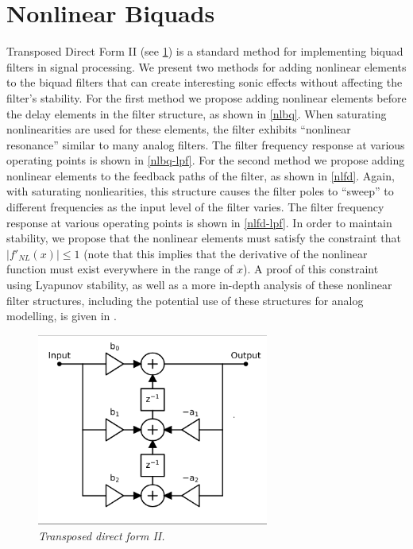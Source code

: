 \documentclass[twoside,a4paper]{article}
\begin{document}
\section{Nonlinear Biquads} \label{sec:nlbq}
%
Transposed Direct Form II (see \cref{tdf2}) is a standard method for
implementing biquad filters in signal processing. We present two
methods for adding nonlinear elements to the biquad filters that
can create interesting sonic effects without affecting the filter's
stability.
\newline\newline
For the first method we propose adding nonlinear elements before the delay
elements in the filter structure, as shown in \cref{nlbq}. When saturating
nonlinearities are used for these elements, the filter exhibits ``nonlinear
resonance'' similar to many analog filters. The filter frequency response at
various operating points is shown in \cref{nlbq-lpf}.
\newline\newline
For the second method we propose adding nonlinear elements to the feedback
paths of the filter, as shown in \cref{nlfd}. Again, with saturating
nonliearities, this structure causes the filter poles to ``sweep'' to
different frequencies as the input level of the filter varies. The filter
frequency response at various operating points is shown in \cref{nlfd-lpf}.
\newline\newline
In order to maintain stability, we propose that the nonlinear elements must
satisfy the constraint that $|f'_{NL}(x)| \leq 1$ (note that this implies that
the derivative of the nonlinear function must exist everywhere in the range
of $x$). A proof of this constraint using Lyapunov stability, as well as a
more in-depth analysis of these nonlinear filter structures, including the
potential use of these structures for analog modelling, is given in
\cite{NLBiquad}.
%
\begin{figure}[h]
    \center
    \includegraphics[width=3in]{../NonlinearBiquad/Pics/TDF-II-White.png}
    \caption{\label{tdf2}{\it Transposed direct form II.}}
\end{figure}
\end{document}
